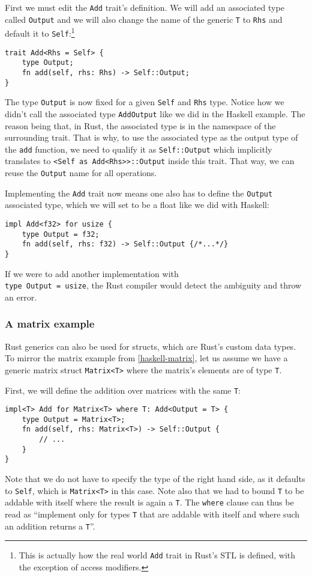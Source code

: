 First we must edit the \verb|Add| trait's definition. We will add an associated type called \verb|Output| and we will also change the name of the generic \verb|T| to \verb|Rhs| and default it to \verb|Self|:\footnote{This is actually how the real world \verb|Add| trait in Rust's STL is defined, with the exception of access modifiers.}
\begin{verbatim}
trait Add<Rhs = Self> {
    type Output;
    fn add(self, rhs: Rhs) -> Self::Output;
}
\end{verbatim}
The type \verb|Output| is now fixed for a given \verb|Self| and \verb|Rhs| type. Notice how we didn't call the associated type \verb|AddOutput| like we did in the Haskell example. The reason being that, in Rust, the associated type is in the namespace of the surrounding trait. That is why, to use the associated type as the output type of the \verb|add| function, we need to qualify it as \verb|Self::Output| which implicitly translates to \verb|<Self as Add<Rhs>>::Output| inside this trait. That way, we can reuse the \verb|Output| name for all operations.

Implementing the \verb|Add| trait now means one also has to define the \verb|Output| associated type, which we will set to be a float like we did with Haskell:
\begin{verbatim}
impl Add<f32> for usize {
    type Output = f32;
    fn add(self, rhs: f32) -> Self::Output {/*...*/}
}
\end{verbatim}
If we were to add another implementation with \\ \verb|type Output = usize|, the Rust compiler would detect the ambiguity and throw an error.

\subsubsection{A matrix example}

Rust generics can also be used for structs, which are Rust's custom data types. To mirror the matrix example from \autoref{haskell-matrix}, let us assume we have a generic matrix struct \verb|Matrix<T>| where the matrix's elements are of type \verb|T|.

First, we will define the addition over matrices with the same \verb|T|:
\begin{verbatim}
impl<T> Add for Matrix<T> where T: Add<Output = T> {
    type Output = Matrix<T>;
    fn add(self, rhs: Matrix<T>) -> Self::Output {
        // ...
    }
}
\end{verbatim}
Note that we do not have to specify the type of the right hand side, as it defaults to \verb|Self|, which is \verb|Matrix<T>| in this case. Note also that we had to bound \verb|T| to be addable with itself where the result is again a \verb|T|. The \verb|where| clause can thus be read as ``implement only for types \verb|T| that are addable with itself and where such an addition returns a \verb|T|''.

